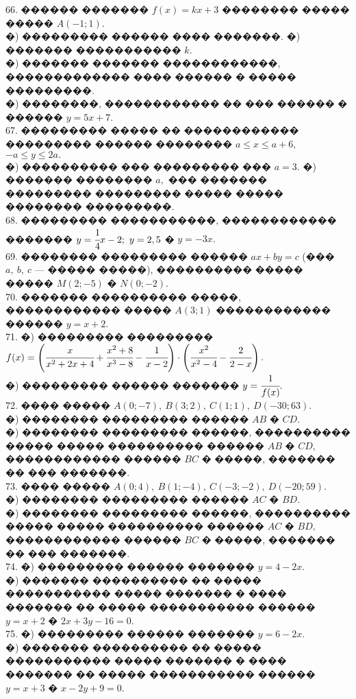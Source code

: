 \documentclass[12pt]{article}
\begin{document}
66. ������ ������� $f(x)=kx+3$ �������� ����� ����� $A(-1;1).$\\
�) ��������� ������ ���� �������. �) ������� ����������� $k.$\\
�) ������� ������� ������������, ������������� ���� ������ � ����� ���������.\\
�) ��������, ������������ �� ��� ������ � ������ $y=5x+7.$\\
67. ��������� ����� �� ������������ ��������� ������ �������� $a\le x \le a+6,$\\
$-a \le y \le 2a.$\\
�) ���������� ��� ��������� ��� $a=3.$ �) ������� �������� $a,$ ��� ������� ��������� ��������� ����� ����� �������� ���������.\\
68. ��������� �����������, ������������ ������� $y=\cfrac{1}{4}x-2;\ y=2,5$ � $y=-3x.$\\
69. �������� ��������� ������ $ax+by=c$ (��� $a,\ b,\ c$ --- ����� �����), ���������� ����� ����� $M(2;-5)$ � $N(0;-2).$\\
70. ������� ���������� �����, ������������ ����� $A(3;1)$ ������������ ������ $y=x+2.$\\
71. �) ��������� ��������� $f(x)=\left(\cfrac{x}{x^2+2x+4}+\cfrac{x^2+8}{x^3-8}-\cfrac{1}{x-2}\right)\cdot\left(
\cfrac{x^2}{x^2-4}-\cfrac{2}{2-x}\right).$\\
�) ��������� ������ ������� $y=\cfrac{1}{f(x)}.$\\
72. ���� ����� $A(0;-7),\ B(3;2),\ C(1;1),\ D(-30;63).$\\
�) �������� ��������� ������ $AB$ � $CD.$\\
�) �������� ��������� ������, ���������� ����� ����� ���������� ������ $AB$ � $CD,$ ������������ ������ $BC$ � �����, ������� �� ��� �������.\\
73. ���� ����� $A(0;4),\ B(1;-4),\ C(-3;-2),\ D(-20;59).$\\
�) �������� ��������� ������ $AC$ � $BD.$\\
�) �������� ��������� ������, ���������� ����� ����� ���������� ������ $AC$ � $BD,$ ������������ ������ $BC$ � �����, ������� �� ��� �������.\\
74. �) ��������� ������ ������� $y=4-2x.$\\
�) ������� ���������� �� ����� ����������� ����� ������� � ���� ������� �� ����� ����������� ������ $y=x+2$ � $2x+3y-16=0.$\\
75. �) ��������� ������ ������� $y=6-2x.$\\
�) ������� ���������� �� ����� ����������� ����� ������� � ���� ������� �� ����� ����������� ������ $y=x+3$ � $x-2y+9=0.$\\
\end{document}
